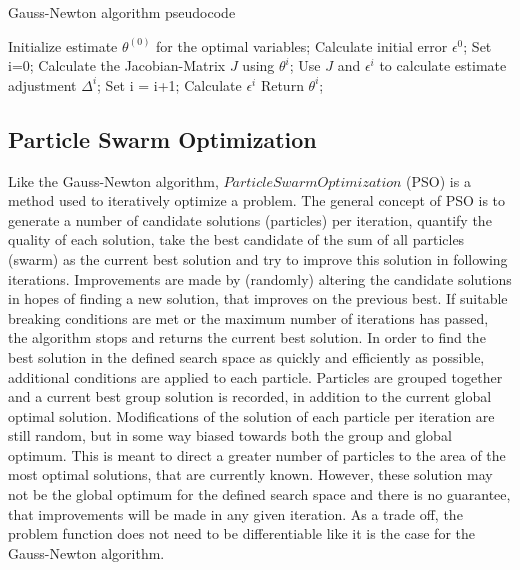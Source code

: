 \begin{algorithm}
	\caption{Gauss-Newton algorithm pseudocode}
	\begin{algorithmic}
		\State Initialize estimate $\theta^{(0)}$ for the optimal variables;
		\State Calculate initial error $\epsilon^0$;
		\State Set i=0;
			\State Calculate the Jacobian-Matrix $J$ using $\theta^i$;
			\State Use $J$ and $\epsilon^i$ to calculate estimate adjustment $\Delta^i$;
			\State Set i = i+1;
			\State Calculate $\epsilon^i$
		\EndWhile
		Return $\theta^i$;
	\end{algorithmic}
\end{algorithm}



\subsection{Particle Swarm Optimization}
\label{sec:PSO}
Like the Gauss-Newton algorithm, $Particle Swarm Optimization$ (PSO) is a method used to iteratively optimize a problem. The general
concept of PSO is to generate a number of candidate solutions (particles) per iteration, quantify the quality of each solution, take the best
candidate of the sum of all particles (swarm) as the current best solution and try to improve this solution in following iterations.
Improvements are made by (randomly) altering the candidate solutions in hopes of finding a new solution, that improves on the previous best.
If suitable breaking conditions are met or the maximum number of iterations has passed, the algorithm stops and returns the current best solution.
In order to find the best solution in the defined search space as quickly and efficiently as possible, additional conditions are applied
to each particle. Particles are grouped together and a current best group solution is recorded, in addition to the current global optimal solution.
Modifications of the solution of each particle per iteration are still random, but in some way biased towards both the group and global optimum.
This is meant to direct a greater number of particles to the area of the most optimal solutions, that are currently known.
However, these solution may not be the global optimum for the defined search space and there is no guarantee, that improvements will be made in any
given iteration. As a trade off, the problem function does not need to be differentiable like it is the case for the Gauss-Newton algorithm. \newline

